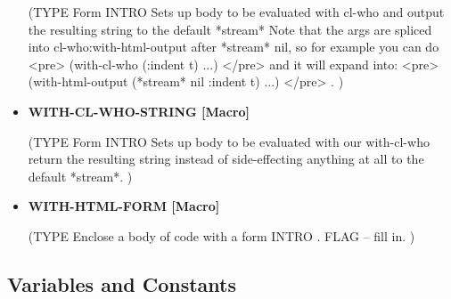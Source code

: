 \documentclass [11pt]{book}
\begin{document}
\begin{itemize}
(TYPE Form INTRO  Sets up body to be evaluated with cl-who and output the resulting string to the default *stream*
Note that the args are spliced into cl-who:with-html-output after *stream* nil, so for example you can do <pre>
    (with-cl-who (:indent t) ...)
</pre>
and it will expand into:
<pre>
    (with-html-output (*stream* nil :indent t) ...)
</pre>
.
)



\item {}
\label{prim:with-cl-who-string}
\textbf{WITH-CL-WHO-STRING [Macro]}

(TYPE Form INTRO  Sets up body to be evaluated with our with-cl-who return the resulting string instead
of side-effecting anything at all to the default *stream*.
)



\item {}
\label{prim:with-html-form}
\textbf{WITH-HTML-FORM [Macro]}

(TYPE Enclose a body of code with a form INTRO .
 FLAG -- fill in. 
)



\end{itemize}



\subsection{Variables and Constants}

\label{subsec:variablesandconstants}
\end{document}
